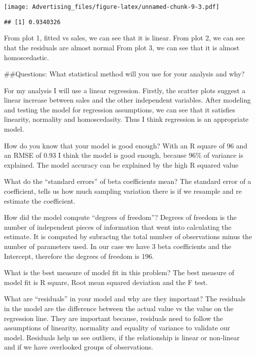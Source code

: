 \documentclass[
]{article}
\newenvironment{Shaded}{\begin{snugshade}}{\end{snugshade}}
\newcommand{\DecValTok}[1]{\textcolor[rgb]{0.00,0.00,0.81}{#1}}
\newcommand{\KeywordTok}[1]{\textcolor[rgb]{0.13,0.29,0.53}{\textbf{#1}}}
\newcommand{\NormalTok}[1]{#1}
\newcommand{\OperatorTok}[1]{\textcolor[rgb]{0.81,0.36,0.00}{\textbf{#1}}}
\begin{document}
\texttt{[image: Advertising\_files/figure-latex/unnamed-chunk-9-3.pdf]}

\begin{Shaded}
\end{Shaded}

\begin{verbatim}
## [1] 0.9340326
\end{verbatim}

From plot 1, fitted vs sales, we can see that it is linear. From plot 2,
we can see that the residuals are almost normal From plot 3, we can see
that it is almost homoscedastic.

\#\#Questions: What statistical method will you use for your analysis
and why?

For my analysis I will use a linear regression. Firstly, the scatter
plots suggest a linear increase between sales and the other independent
variables. After modeling and testing the model for regression
assumptions, we can see that it satisfies linearity, normality and
homoscedasity. Thus I think regression is an appropriate model.

How do you know that your model is good enough? With an R square of 96
and an RMSE of 0.93 I think the model is good enough, because 96\% of
variance is explained. The model accuracy can be explained by the high R
squared value

What do the ``standard errors'' of beta coefficients mean? The standard
error of a coefficient, tells us how much sampling variation there is if
we resample and re estimate the coefficient.

How did the model compute ``degrees of freedom''? Degrees of freedom is
the number of independent pieces of information that went into
calculating the estimate. It is computed by subractng the total number
of observations minus the number of parameters used. In our case we have
3 beta coefficients and the Intercept, therefore the degrees of freedom
is 196.

What is the best measure of model fit in this problem? The best measure
of model fit is R square, Root mean squared deviation and the F test.

What are ``residuals'' in your model and why are they important? The
residuals in the model are the difference between the actual value vs
the value on the regression line. They are important because, residuals
need to follow the assumptions of linearity, normality and equality of
variance to validate our model. Residuals help us see outliers, if the
relationship is linear or non-linear and if we have overlooked groups of
observations.
\end{document}
